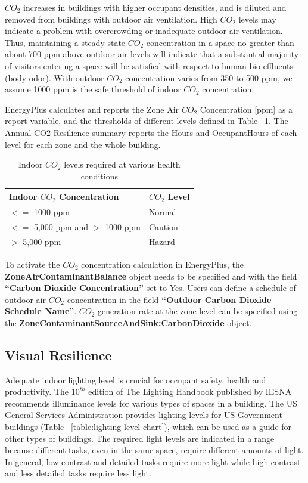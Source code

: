 $CO_2$ increases in buildings with higher occupant densities, and is diluted and removed from buildings with outdoor air ventilation. High $CO_2$ levels may indicate a problem with overcrowding or inadequate outdoor air ventilation. Thus, maintaining a steady-state $CO_2$ concentration in a space no greater than about 700 ppm above outdoor air levels will indicate that a substantial majority of visitors entering a space will be satisfied with respect to human bio-effluents (body odor). With outdoor $CO_2$ concentration varies from 350 to 500 ppm, we assume 1000 ppm is the safe threshold of indoor $CO_2$ concentration.

EnergyPlus calculates and reports the Zone Air $CO_2$ Concentration [ppm] as a report variable, and the thresholds of different levels defined in Table ~\ref{table:co2-lvel-chart}. The Annual CO2 Resilience summary reports the Hours and OccupantHours of each level for each zone and the whole building.

\begin{table}
\centering
\caption{Indoor $CO_2$ levels required at various health conditions \protect \label{table:co2-lvel-chart}} \tabularnewline
\begin{tabular}{ |p{2in}|p{2in}|  }
\hline
      \textbf{Indoor $CO_2$ Concentration } & \textbf{$CO_2$ Level} \\ \hline
      $<=$ 1000 ppm & Normal \\ \hline
      $<=$ 5,000 ppm and $>$ 1000 ppm & Caution \\ \hline
      $>$ 5,000 ppm  & Hazard \\ \hline
\end{tabular}
\end{table}

To activate the $CO_2$ concentration calculation in EnergyPlus, the \textbf{ZoneAirContaminantBalance} object needs to be specified and with the field \textbf{“Carbon Dioxide Concentration”} set to Yes. Users can define a schedule of outdoor air $CO_2$ concentration in the field \textbf{“Outdoor Carbon Dioxide Schedule Name”}. $CO_2$ generation rate at the zone level can be specified using the \textbf{ZoneContaminantSourceAndSink:CarbonDioxide} object.

\subsection{Visual Resilience}\label{visual-resilience}

Adequate indoor lighting level is crucial for occupant safety, health and productivity. The $10^{th}$ edition of The Lighting Handbook published by IESNA recommends illuminance levels for various types of spaces in a building. The US General Services Administration provides lighting levels for US Government buildings (Table ~\ref{table:lighting-level-chart}), which can be used as a guide for other types of buildings. The required light levels are indicated in a range because different tasks, even in the same space, require different amounts of light. In general, low contrast and detailed tasks require more light while high contrast and less detailed tasks require less light.

